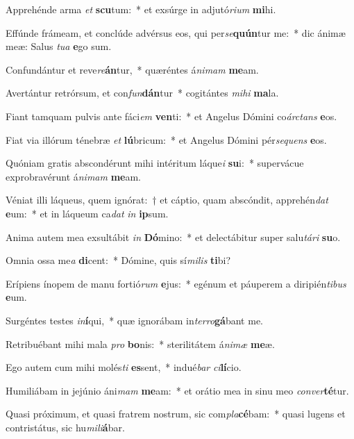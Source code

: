 \item Apprehénde arma \textit{et} \textbf{scu}tum:~* et exsúrge in adjutó\textit{ri}\textit{um} \textbf{mi}hi.
\item Effúnde frámeam, et conclúde advérsus eos, qui per\textit{se}\textbf{quún}tur me:~* dic ánimæ meæ: Salus \textit{tu}\textit{a} \textbf{e}go sum.
\item Confundántur et reve\textit{re}\textbf{án}tur,~* quæréntes á\textit{ni}\textit{mam} \textbf{me}am.
\item Avertántur retrórsum, et con\textit{fun}\textbf{dán}tur~* cogitántes \textit{mi}\textit{hi} \textbf{ma}la.
\item Fiant tamquam pulvis ante fáci\textit{em} \textbf{ven}ti:~* et Angelus Dómini co\textit{árc}\textit{tans} \textbf{e}os.
\item Fiat via illórum ténebræ \textit{et} \textbf{lú}bricum:~* et Angelus Dómini pér\textit{se}\textit{quens} \textbf{e}os.
\item Quóniam gratis abscondérunt mihi intéritum láque\textit{i} \textbf{su}i:~* supervácue exprobravérunt á\textit{ni}\textit{mam} \textbf{me}am.
\item Véniat illi láqueus, quem ignórat:~† et cáptio, quam abscóndit, apprehén\textit{dat} \textbf{e}um:~* et in láqueum ca\textit{dat} \textit{in} \textbf{ip}sum.
\item Anima autem mea exsultábit \textit{in} \textbf{Dó}mino:~* et delectábitur super salu\textit{tá}\textit{ri} \textbf{su}o.
\item Omnia ossa me\textit{a} \textbf{di}cent:~* Dómine, quis sí\textit{mi}\textit{lis} \textbf{ti}bi?
\item Erípiens ínopem de manu fortió\textit{rum} \textbf{e}jus:~* egénum et páuperem a diripién\textit{ti}\textit{bus} \textbf{e}um.
\item Surgéntes testes \textit{in}\textbf{í}qui,~* quæ ignorábam in\textit{ter}\textit{ro}\textbf{gá}bant me.
\item Retribuébant mihi mala \textit{pro} \textbf{bo}nis:~* sterilitátem á\textit{ni}\textit{mæ} \textbf{me}æ.
\item Ego autem cum mihi molés\textit{ti} \textbf{es}sent,~* indué\textit{bar} \textit{ci}\textbf{lí}cio.
\item Humiliábam in jejúnio áni\textit{mam} \textbf{me}am:~* et orátio mea in sinu meo \textit{con}\textit{ver}\textbf{té}tur.
\item Quasi próximum, et quasi fratrem nostrum, sic com\textit{pla}\textbf{cé}bam:~* quasi lugens et contristátus, sic hu\textit{mi}\textit{li}\textbf{á}bar.
